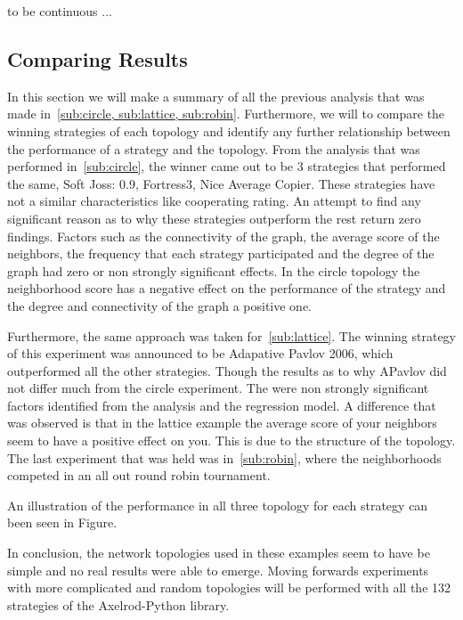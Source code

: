 to be continuous ...

\subsection{Comparing Results}

In this section we will make a summary of all the previous analysis that was made
in~\ref{sub:circle, sub:lattice, sub:robin}. Furthermore, we will to compare
the winning strategies of each topology and identify any further relationship
between the performance of a strategy and the topology. From the analysis that
was performed in~\ref{sub:circle}, the winner came out to be 3 strategies that
performed the same, Soft Joss: 0.9, Fortress3, Nice Average Copier.
These strategies have not a similar characteristics like cooperating rating.
An attempt to find any significant reason as to why these strategies outperform
the rest return zero findings. Factors such as the connectivity of the graph,
the average score of the neighbors, the frequency that each strategy participated
and the degree of the graph had zero or non strongly significant effects.
In the circle topology the neighborhood score has a negative effect on the performance
of the strategy and the degree and connectivity of the graph a positive one.

Furthermore, the same approach was taken for~\ref{sub:lattice}. The winning
strategy of this experiment was announced to be Adapative Pavlov 2006, which
outperformed all the other strategies. Though the results as to why APavlov
did not differ much from the circle experiment. The were non strongly significant
factors identified from the analysis and the regression model. A difference
that was observed is that in the lattice example the average score of your
neighbors seem to have a positive effect on you. This is due to the structure of
the topology. The last experiment that was held was in~\ref{sub:robin}, where
the neighborhoods competed in an all out round robin tournament.

An illustration of the performance in all three topology for each strategy can
been seen in Figure.


In conclusion, the network topologies used in these examples seem to have be
simple and no real results were able to emerge. Moving forwards experiments
with more complicated and random topologies will be performed with all the 132
strategies of the Axelrod-Python library.
